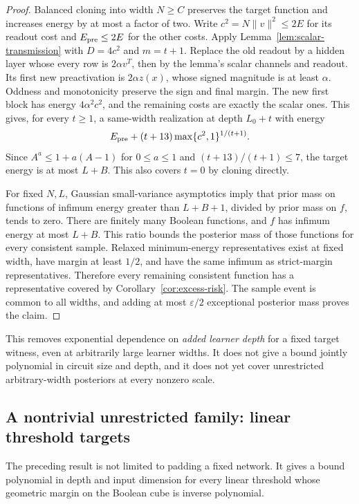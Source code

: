 \begin{proof}
Balanced cloning into width $N\ge C$ preserves the target function and
increases energy by at most a factor of two. Write $c^2=N\|v\|^2\le2E$ for its readout
cost and $E_{\rm pre}\le2E$ for the other costs.
Apply Lemma~\ref{lem:scalar-transmission} with $D=4c^2$ and $m=t+1$.
Replace the old readout by a hidden layer whose every row is $2\alpha v^T$,
then by the lemma's scalar channels and readout. Its first new preactivation
is $2\alpha z(x)$, whose signed magnitude is at least $\alpha$.
Oddness and monotonicity preserve the sign and final margin. The new first
block has energy $4\alpha^2c^2$, and the remaining costs are exactly the
scalar ones. This gives, for every $t\ge1$, a same-width realization at
depth $L_0+t$ with energy
\[
 E_{\rm pre}+(t+13)\max\{c^2,1\}^{1/(t+1)}.
\]
Since $A^a\le1+a(A-1)$ for $0\le a\le1$ and
$(t+13)/(t+1)\le7$, the target energy is at most $L+B$.
This also covers $t=0$ by cloning directly.

For fixed $N,L$, Gaussian small-variance asymptotics imply that prior
mass on functions of infimum energy greater than $L+B+1$, divided by
prior mass on $f$, tends to zero. There are finitely many Boolean functions,
and $f$ has infimum energy at most $L+B$. This ratio bounds the posterior
mass of those functions for every consistent sample. Relaxed minimum-energy
representatives exist at fixed width, have margin at least $1/2$, and have
the same infimum as strict-margin representatives. Therefore every remaining
consistent function has a representative covered by
Corollary~\ref{cor:excess-risk}. The sample event is common to all widths,
and adding at most $\varepsilon/2$ exceptional posterior mass proves the claim.
\end{proof}

This removes exponential dependence on \emph{added learner depth} for a
fixed target witness, even at arbitrarily large learner widths. It does not
give a bound jointly polynomial in circuit size and depth, and it does not
yet cover unrestricted arbitrary-width posteriors at every nonzero scale.

\subsection{A nontrivial unrestricted family: linear threshold targets}

The preceding result is not limited to padding a fixed network. It gives a
bound polynomial in depth and input dimension for every linear threshold
whose geometric margin on the Boolean cube is inverse polynomial.

